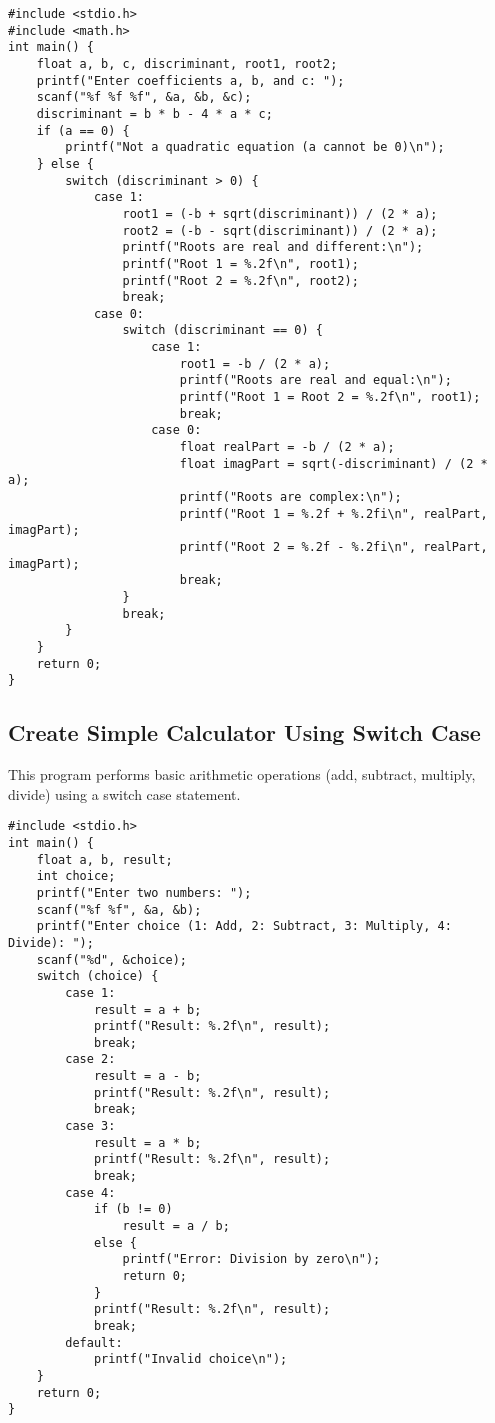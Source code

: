 \documentclass[a4paper,12pt]{article}
\begin{document}
\begin{lstlisting}[caption={Find Roots of a Quadratic Equation Using Switch Case}]
#include <stdio.h>
#include <math.h>
int main() {
    float a, b, c, discriminant, root1, root2;
    printf("Enter coefficients a, b, and c: ");
    scanf("%f %f %f", &a, &b, &c);
    discriminant = b * b - 4 * a * c;
    if (a == 0) {
        printf("Not a quadratic equation (a cannot be 0)\n");
    } else {
        switch (discriminant > 0) {
            case 1:
                root1 = (-b + sqrt(discriminant)) / (2 * a);
                root2 = (-b - sqrt(discriminant)) / (2 * a);
                printf("Roots are real and different:\n");
                printf("Root 1 = %.2f\n", root1);
                printf("Root 2 = %.2f\n", root2);
                break;
            case 0:
                switch (discriminant == 0) {
                    case 1:
                        root1 = -b / (2 * a);
                        printf("Roots are real and equal:\n");
                        printf("Root 1 = Root 2 = %.2f\n", root1);
                        break;
                    case 0:
                        float realPart = -b / (2 * a);
                        float imagPart = sqrt(-discriminant) / (2 * a);
                        printf("Roots are complex:\n");
                        printf("Root 1 = %.2f + %.2fi\n", realPart, imagPart);
                        printf("Root 2 = %.2f - %.2fi\n", realPart, imagPart);
                        break;
                }
                break;
        }
    }
    return 0;
}
\end{lstlisting}

\newpage

\subsection{Create Simple Calculator Using Switch Case}
This program performs basic arithmetic operations (add, subtract, multiply, divide) using a switch case statement.

\begin{lstlisting}[caption={Create Simple Calculator Using Switch Case}]
#include <stdio.h>
int main() {
    float a, b, result;
    int choice;
    printf("Enter two numbers: ");
    scanf("%f %f", &a, &b);
    printf("Enter choice (1: Add, 2: Subtract, 3: Multiply, 4: Divide): ");
    scanf("%d", &choice);
    switch (choice) {
        case 1:
            result = a + b;
            printf("Result: %.2f\n", result);
            break;
        case 2:
            result = a - b;
            printf("Result: %.2f\n", result);
            break;
        case 3:
            result = a * b;
            printf("Result: %.2f\n", result);
            break;
        case 4:
            if (b != 0)
                result = a / b;
            else {
                printf("Error: Division by zero\n");
                return 0;
            }
            printf("Result: %.2f\n", result);
            break;
        default:
            printf("Invalid choice\n");
    }
    return 0;
}
\end{lstlisting}
\end{document}
